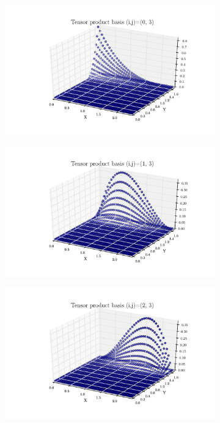 \documentclass[11pt,letterpaper]{article}
\begin{document}
    \begin{figure}[!tbh]
  \begin{subfigure}[b]{.6\textwidth}
    \includegraphics[width=\textwidth]{problem_2_2_0_3.pdf}
    \caption{}
    \label{fig4:label:a}
  \end{subfigure}
  \hfill
  \begin{subfigure}[b]{.6\textwidth}
    \includegraphics[width=\textwidth]{problem_2_2_1_3.pdf}
    \caption{}
    \label{fig4:label:b}
  \end{subfigure}
  \hfill
    \begin{subfigure}[b]{.6\textwidth}
    \includegraphics[width=\textwidth]{problem_2_2_2_3.pdf}

\end{subfigure}
\end{figure}
\end{document}
